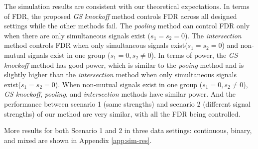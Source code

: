 \documentclass[11pt]{article}
\theoremstyle{plain}
\theoremstyle{definition}
\theoremstyle{remark}
\newcommand{\0}{\mathbf{0}}
\begin{document}
The simulation results are consistent with our theoretical expectations. In terms of FDR, the proposed \textit{GS knockoff} method controls FDR across all designed settings while the other methods fail. The \textit{pooling} method can control FDR only when there are only simultaneous signals exist ($s_1=s_2=0$). The \textit{intersection} method controls FDR when only simultaneous signals exist($s_1=s_2=0$) and non-mutual signals exist in one group ($s_1=0, s_2\neq0$). In terms of power, the \textit{GS knockoff} method has good power, which is similar to the \textit{pooing} method and is slightly higher than the \textit{intersection} method when only simultaneous signals exist($s_1=s_2=0$). When non-mutual signals exist in one group ($s_1=0, s_2\neq0$), \textit{GS knockoff}, \textit{pooling}, and \textit{intersection} methods have similar power. And the performance between scenario 1 (same strengths) and scenario 2 (different signal strengths) of our method are very similar, with all the FDR being controlled. 

More results for both Scenario 1 and 2 in three data settings: continuous, binary, and mixed are shown in Appendix \ref{app:sim-res}.
\end{document}
